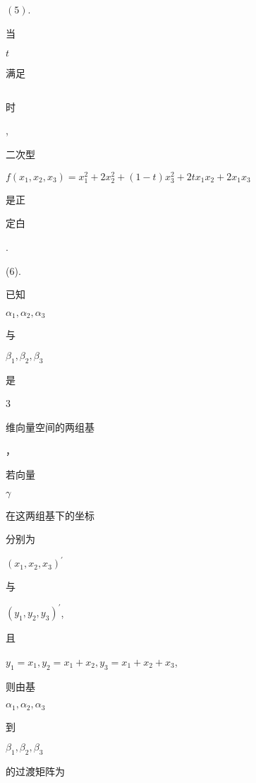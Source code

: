 \documentclass[10pt]{article}
\begin{document}
$(5)$. \begin{CJK}{UTF8}{mj}当\end{CJK} $t$ \begin{CJK}{UTF8}{mj}满足\end{CJK} $\quad$ \begin{CJK}{UTF8}{mj}时\end{CJK}, \begin{CJK}{UTF8}{mj}二次型\end{CJK} $f\left(x_{1}, x_{2}, x_{3}\right)=x_{1}^{2}+2 x_{2}^{2}+(1-t) x_{3}^{2}+2 t x_{1} x_{2}+2 x_{1} x_{3}$ \begin{CJK}{UTF8}{mj}是正\end{CJK} \begin{CJK}{UTF8}{mj}定白\end{CJK}.

(6). \begin{CJK}{UTF8}{mj}已知\end{CJK} $\alpha_{1}, \alpha_{2}, \alpha_{3}$ \begin{CJK}{UTF8}{mj}与\end{CJK} $\beta_{1}, \beta_{2}, \beta_{3}$ \begin{CJK}{UTF8}{mj}是\end{CJK} 3 \begin{CJK}{UTF8}{mj}维向量空间的两组基\end{CJK}，\begin{CJK}{UTF8}{mj}若向量\end{CJK} $\gamma$ \begin{CJK}{UTF8}{mj}在这两组基下的坐标\end{CJK} \begin{CJK}{UTF8}{mj}分别为\end{CJK} $\left(x_{1}, x_{2}, x_{3}\right)^{\prime}$ \begin{CJK}{UTF8}{mj}与\end{CJK} $\left(y_{1}, y_{2}, y_{3}\right)^{\prime}$, \begin{CJK}{UTF8}{mj}且\end{CJK} $y_{1}=x_{1}, y_{2}=x_{1}+x_{2}, y_{3}=x_{1}+x_{2}+x_{3}$, \begin{CJK}{UTF8}{mj}则由基\end{CJK} $\alpha_{1}, \alpha_{2}, \alpha_{3}$ \begin{CJK}{UTF8}{mj}到\end{CJK} $\beta_{1}, \beta_{2}, \beta_{3}$ \begin{CJK}{UTF8}{mj}的过渡矩阵为\end{CJK}
\end{document}
